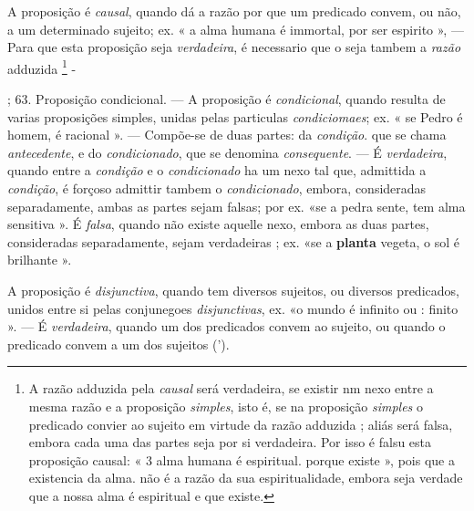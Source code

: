 
A proposição é \emph{causal}, quando dá a razão por que um predicado convem, ou não, a um determinado sujeito; ex. « a alma humana é immortal, por ser espirito », --- Para que esta proposição seja \emph{verdadeira}, é necessario que o seja tambem a \emph{razão} adduzida \footnote{A razão adduzida pela \emph{causal} será verdadeira, se existir nm nexo entre a mesma razão e a proposição \emph{simples}, isto é, se na proposição \emph{simples} o predicado convier ao sujeito em virtude da razão adduzida ; aliás será falsa, embora cada uma das partes seja por si verdadeira. Por isso é falsu esta proposição causal: « 3 alma humana é espiritual. porque existe », pois que a existencia da alma. não é a razão da sua espiritualidade, embora seja verdade que a nossa alma é espiritual e que existe.} -

; 63. Proposição condicional. --- A proposição é \emph{condicional}, quando resulta de varias proposições simples, unidas pelas particulas \emph{condiciomaes}; ex. « se Pedro é homem, é racional ». --- Compõe-se de duas partes: da \emph{condição}. que se chama \emph{antecedente}, e do \emph{condicionado}, que se denomina \emph{consequente}. --- É \emph{verdadeira}, quando entre a \emph{condição} e o \emph{condicionado} ha um nexo tal que, admittida a \emph{condição}, é forçoso admittir tambem o \emph{condicionado}, embora, consideradas separadamente, ambas as partes sejam falsas; por ex. «se a pedra sente, tem alma sensitiva  ». É \emph{falsa}, quando não existe aquelle nexo, embora as duas partes, consideradas separadamente, sejam verdadeiras ; ex. «se a \textbf{planta} vegeta, o sol é brilhante ».


A proposição é \emph{disjunctiva}, quando tem diversos sujeitos, ou diversos predicados, unidos entre si pelas conjunegoes \emph{disjunctivas}, ex. «o mundo é infinito ou : finito ». --- É \emph{verdadeira}, quando um dos predicados convem ao sujeito, ou quando o predicado convem a um dos sujeitos (').


